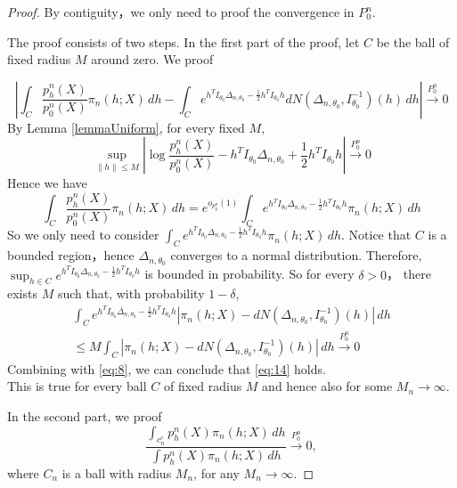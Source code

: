 \begin{proof}
    By contiguity，we only need to proof the convergence in $P_0^n$.

The proof consists of two steps. In the first part of the proof, let $C$ be the ball of fixed radius $M$ around zero. We proof

\begin{equation}\label{eq:14}
    \left|\int_C \frac{p^n_h(X)}{p^n_0(X)}\pi_n (h;X) \, dh-\int_C e^{h^TI_{\theta_0}\Delta_{n,\theta_0}-\frac{1}{2}h^TI_{\theta_0}h}dN(\Delta_{n,\theta_0},I_{\theta_0}^{-1})(h)\, dh\right|
 \xrightarrow{P^n_0}0
\end{equation}
By Lemma \ref{lemmaUniform}, for every fixed $M$,
\begin{equation}
    \sup_{\|h\|\leq M}|\log \frac{p_h^n(X)}{p_0^n(X)}-h^TI_{\theta_0}\Delta_{n,\theta_0}+\frac{1}{2}h^TI_{\theta_0}h|\xrightarrow{P_0^n}0 
\end{equation}
Hence we have
\begin{equation}\label{eq:8}
    \int_C \frac{p_h^n(X)}{p_0^n(X)}\pi_n (h;X) \, dh=e^{o_{p^n_0}(1)}\int_C e^{h^TI_{\theta_0}\Delta_{n,\theta_0}-\frac{1}{2}h^TI_{\theta_0}h}\pi_n (h;X) \, dh
\end{equation}
So we only need to consider $\int_C e^{h^TI_{\theta_0}\Delta_{n,\theta_0}-\frac{1}{2}h^TI_{\theta_0}h}\pi_n (h;X) \, dh$. Notice that $C$ is a bounded region，hence $\Delta_{n,\theta_0}$ converges to a normal distribution. Therefore, $\sup_{h\in C}e^{h^TI_{\theta_0}\Delta_{n,\theta_0}-\frac{1}{2}h^TI_{\theta_0}h}$ is bounded in probability. So for every $\delta>0$， there exists $M$ such that, with probability $1-\delta$,
\begin{equation}
\begin{aligned}
    \int_C e^{h^TI_{\theta_0}\Delta_{n,\theta_0}-\frac{1}{2}h^TI_{\theta_0}h}|\pi_n (h;X)-dN(\Delta_{n,\theta_0},I_{\theta_0}^{-1})(h)|\, dh
\\
\leq M\int_C |\pi_n(h;X)-dN(\Delta_{n,\theta_0},I_{\theta_0}^{-1})(h)|\, dh\xrightarrow{P^n_0}0
\end{aligned}
\end{equation}
Combining with \eqref{eq:8}, we can conclude that \eqref{eq:14} holds. \\

This is true for every ball $C$ of fixed radius $M$ and hence also for some $M_n\to \infty$.

In the second part, we proof
\begin{equation}\label{eq:4}
    \frac{\int_{c_n^c}p_h^n(X)\pi_n(h;X)\, dh}{\int p_h^n(X)\pi_n(h;X)\, dh}\xrightarrow{P_0^n}0,
\end{equation}
where $C_n$ is a ball with radius $M_n$, for any $M_n\to \infty$.
    

\end{proof}
